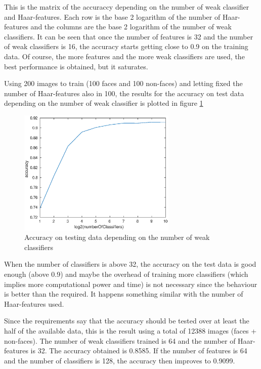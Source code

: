 \documentclass{article}
\begin{document}
This is the matrix of the accuraccy depending on the number of weak classifier and Haar-features. Each row is the base 2 logarithm of the number of Haar-features and the columns are the base 2 logarithm of the number of weak classifiers. It can be seen that once the number of features is 32 and the number of weak classifiers is 16, the accuracy starts getting close to 0.9 on the training data. Of course, the more features and the more weak classifiers are used, the best performance is obtained, but it saturates.

Using 200 images to train (100 faces and 100 non-faces) and letting fixed the number of Haar-features also in 100, the results for the accuracy on test data depending on the number of weak classifier is plotted in figure  \ref{fig:accuracyOnTestDONumClassifiers}

\begin{figure}[h]
\centering
\includegraphics[height=6cm]{images/accuracyOnTestDONumClassifiers}
\caption{Accuracy on testing data depending on the number of weak classifiers}
\label{fig:accuracyOnTestDONumClassifiers}
\end{figure}

When the number of classifiers is above 32, the accuracy on the test data is good enough (above 0.9) and maybe the overhead of training more classifiers (which implies more computational power and time) is not necessary since the behaviour is better than the required. It happens something similar with the number of Haar-features used.

Since the requirements say that the accuracy should be tested over at least the half of the available data, this is the result using a total of 12388 images (faces + non-faces). The number of weak classifiers trained is 64 and the number of Haar-features is 32. The accuracy obtained is 0.8585. If the number of features is 64 and the number of classifiers is 128, the accuracy then improves to 0.9099.
\end{document}
